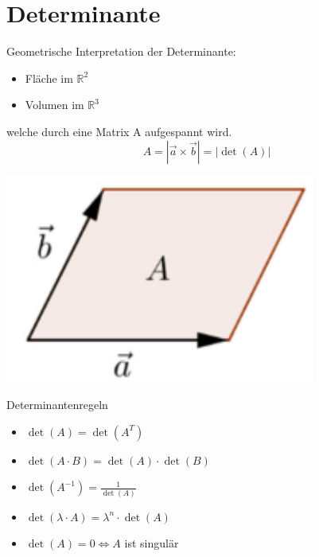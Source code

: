 \graphicspath{{images/}}

\section{Determinante}

\begin{definition}{Geometrische Interpretation} der Determinante:\\
    \begin{minipage}{0.6\linewidth}
    \begin{itemize}
        \item Fläche im $\mathbb{R}^2$
        \item Volumen im $\mathbb{R}^3$
    \end{itemize}
    welche durch eine Matrix A aufgespannt wird.
    $$A = |\vec{a} \times \vec{b}| = |\det(A)|$$
    \end{minipage}
    \begin{minipage}{0.35\linewidth}
        \includegraphics[width=0.9\linewidth]{determinante.png}
    \end{minipage}
\end{definition}

\begin{theorem}{Determinantenregeln}\\
    \begin{minipage}{0.5\linewidth}
        \begin{itemize}
            \item $\det(A) = \det(A^T)$
            \item $\det(A \cdot B) = \det(A) \cdot \det(B)$
            \item $\det(A^{-1}) = \frac{1}{\det(A)}$
        \end{itemize}
    \end{minipage}
    \begin{minipage}{0.5\linewidth}
        \begin{itemize}
            \item $\det(\lambda \cdot A) = \lambda^n \cdot \det(A)$
            \item $\det(A) = 0 \Leftrightarrow A$ ist singulär
        \end{itemize}
    \end{minipage}
\end{theorem}

